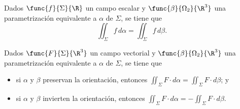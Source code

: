 \documentclass[a4,11pt]{aleph-notas}
\begin{document}
\begin{prop}
    Dados $\func{f}{\Sigma}{\R}$ un campo escalar y $\func{\beta}{\Omega_2}{\R^3}$ una parametrización equivalente a $\alpha$ de $\Sigma$, se tiene que
    \[
        \iint_\Sigma f \,d\alpha = \iint_\Sigma f \,d\beta.
    \]
\end{prop}

\begin{prop}
    Dados $\func{F}{\Sigma}{\R^3}$ un campo vectorial y $\func{\beta}{\Omega_2}{\R^3}$ una parametrización equivalente a $\alpha$ de $\Sigma$, se tiene que
    \begin{itemize}
        \item si $\alpha$ y $\beta$ preservan la orientación, entonces $\iint_\Sigma F \cdot d\alpha = \iint_\Sigma F \cdot d\beta$; y
        \item si $\alpha$ y $\beta$ invierten la orientación, entonces $\iint_\Sigma F \cdot d\alpha = -\iint_\Sigma F \cdot d\beta$.
    \end{itemize}
\end{prop}
\end{document}
